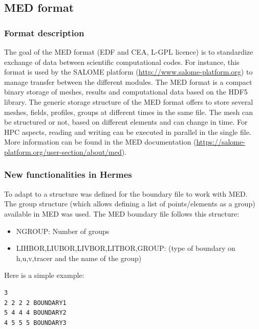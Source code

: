 \subsection{MED format}
%
\subsubsection{Format description}
%
The goal of the MED format (EDF and CEA, L-GPL licence) is to standardize
exchange of data between scientific computational codes. For instance, this
format is used by the SALOME platform (\url{http://www.salome-platform.org})
to manage transfer between the different modules. The MED format is a compact
binary storage of meshes, results and computational data based on the HDF5
library. The generic storage structure of the MED format offers to store
several meshes, fields, profiles, groups at different times in the same file.
The mesh can be structured or not, based on different elements and can change
in time. For HPC aspects, reading and writing can be executed in parallel in
the single file. More information can be found in the MED documentation
(\url{https://salome-platform.org/user-section/about/med}).
%
\subsubsection{New functionalities in Hermes}
%
To adapt to \telemacsystem a structure was defined for the boundary file to work with
MED. The group structure (which allows defining a list of points/elements as a
group) available in MED was used. The MED boundary file follows this structure:
\begin{itemize}
\item NGROUP: Number of groups
\item LIHBOR,LIUBOR,LIVBOR,LITBOR,GROUP: (type of boundary on h,u,v,tracer and
the name of the group)
\end{itemize}
%
Here is a simple example:
\begin{verbatim}
3
2 2 2 2 BOUNDARY1
5 4 4 4 BOUNDARY2
4 5 5 5 BOUNDARY3
\end{verbatim}

%

